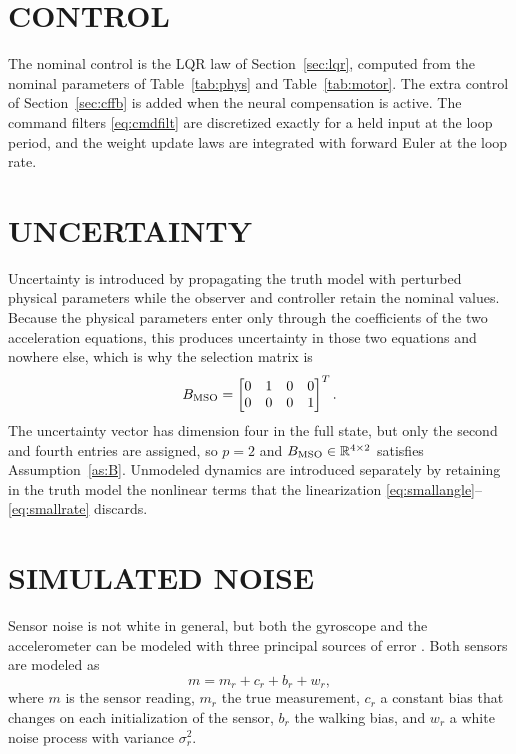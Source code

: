 \section{CONTROL}

The nominal control is the LQR law of Section~\ref{sec:lqr}, computed from the
nominal parameters of Table~\ref{tab:phys} and Table~\ref{tab:motor}. The extra
control of Section~\ref{sec:cffb} is added when the neural compensation is
active. The command filters \eqref{eq:cmdfilt} are discretized exactly for a
held input at the loop period, and the weight update laws are integrated with
forward Euler at the loop rate.

\section{UNCERTAINTY}

Uncertainty is introduced by propagating the truth model with perturbed physical
parameters while the observer and controller retain the nominal values. Because
the physical parameters enter only through the coefficients of the two
acceleration equations, this produces uncertainty in those two equations and
nowhere else, which is why the selection matrix is
\begin{equation}\label{eq:Bmso}
B_{\mathrm{MSO}}=\begin{bmatrix}0&1&0&0\\0&0&0&1\end{bmatrix}^T .
\end{equation}
The uncertainty vector has dimension four in the full state, but only the second
and fourth entries are assigned, so $p=2$ and $B_{\mathrm{MSO}}\in\mathbb{R}^{4\times2}$ satisfies
Assumption~\ref{as:B}. Unmodeled dynamics are introduced separately by retaining
in the truth model the nonlinear terms that the linearization
\eqref{eq:smallangle}--\eqref{eq:smallrate} discards.

\section{SIMULATED NOISE}
\label{sec:noise}

Sensor noise is not white in general, but both the gyroscope and the
accelerometer can be modeled with three principal sources of error
\cite{gebreegziabher2004design,flenniken2005modeling}. Both sensors are modeled as
\begin{equation}\label{eq:sensormodel}
m=m_r+c_r+b_r+w_r ,
\end{equation}
where $m$ is the sensor reading, $m_r$ the true measurement, $c_r$ a constant
bias that changes on each initialization of the sensor, $b_r$ the walking bias,
and $w_r$ a white noise process with variance $\sigma_r^2$.

